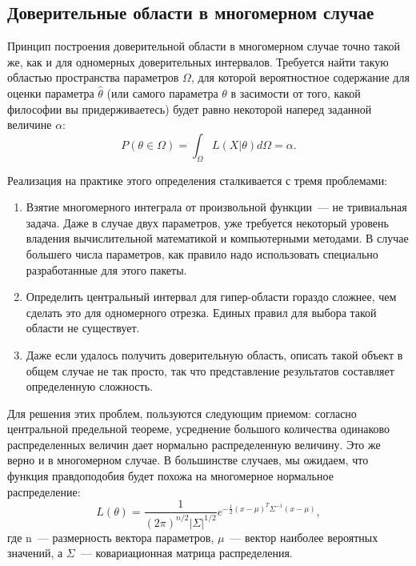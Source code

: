 \subsection{Доверительные области в многомерном случае}

    Принцип построения доверительной области в многомерном случае точно
такой же, как и для одномерных доверительных интервалов. Требуется найти
такую областью пространства параметров $\Omega$, для которой
вероятностное содержание для оценки параметра $\hat \theta$ (или
самого параметра $\theta$ в засимости от того, какой философии вы
придерживаетесь) будет равно некоторой наперед заданной величине
$\alpha$:
\begin{equation}
P(\theta \in \Omega) = \int_\Omega{L(X | \theta)}d\Omega = \alpha.
\end{equation}

Реализация на практике этого определения сталкивается с тремя
проблемами:

\begin{enumerate}
\item Взятие многомерного интеграла от произвольной функции~--- не тривиальная
  задача. Даже в случае двух параметров, уже требуется некоторый уровень
  владения вычислительной математикой и компьютерными методами. В случае
  большего числа параметров, как правило надо использовать специально
  разработанные для этого пакеты.
\item Определить центральный интервал для гипер-области гораздо сложнее, чем
  сделать это для одномерного отрезка. Единых правил для выбора такой
  области не существует.
\item Даже если удалось получить доверительную область, описать такой объект
  в общем случае не так просто, так что представление результатов
  составляет определенную сложность.
\end{enumerate}

Для решения этих проблем, пользуются следующим приемом: согласно
центральной предельной теореме, усреднение большого количества одинаково
распределенных величин дает нормально распределенную величину. Это же
верно и в многомерном случае. В большинстве случаев, мы ожидаем, что
функция правдоподобия будет похожа на многомерное нормальное
распределение:
\begin{equation}
    L(\theta) = \frac{1}{(2 \pi)^{n/2}\left|\Sigma\right|^{1/2}} e^{-\frac{1}{2}
(x - \mu)^T \Sigma^{-1} (x - \mu)},
\end{equation}
где n~--- размерность вектора параметров, $\mu$~--- вектор
наиболее вероятных значений, а $\Sigma$~--- ковариационная матрица распределения.


